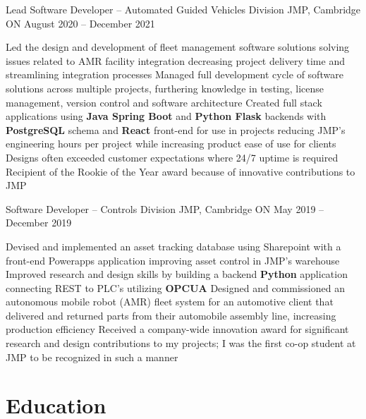 \begin{subheading}
	\resumeExp
	{Lead Software Developer -- Automated Guided Vehicles Division}
	{JMP, Cambridge ON}
	{August 2020 -- December 2021}
	{}
	\begin{entries}
		\ib Led the design and development of fleet management software solutions solving issues related to
		AMR facility integration decreasing project delivery time and streamlining integration processes
		\ib  Managed full development cycle of software solutions across multiple projects, furthering
		knowledge in testing, license management, version control and software architecture
		\ib Created full stack applications using \textbf{Java Spring Boot} and \textbf{Python Flask} backends with
		\textbf{PostgreSQL} schema and \textbf{React} front-end for use in projects reducing JMP's engineering hours
		per project while increasing product ease of use for clients
		\ib Designs often exceeded customer expectations where 24/7 uptime is required
		\ib Recipient of the Rookie of the Year award because of innovative contributions to JMP
	\end{entries}

	\newpage
	\resumeExp
	{Software Developer -- Controls Division}
	{JMP, Cambridge ON}
	{May 2019 -- December 2019}
	{}
	\begin{entries}
		\ib Devised and implemented an asset tracking database using Sharepoint with a front-end
		Powerapps application improving asset control in JMP's warehouse
		\ib Improved research and design skills by building a backend \textbf{Python} application connecting REST
		to PLC's utilizing \textbf{OPCUA}
		\ib Designed and commissioned an autonomous mobile robot (AMR) fleet system for an automotive client that delivered and
		returned parts from their automobile assembly line, increasing production efficiency
		\ib Received a company-wide innovation award for significant research and design contributions to
		my projects; I was the first co-op student at JMP to be recognized in such a manner
	\end{entries}

\end{subheading}
\sectionsep
\section{Education}

